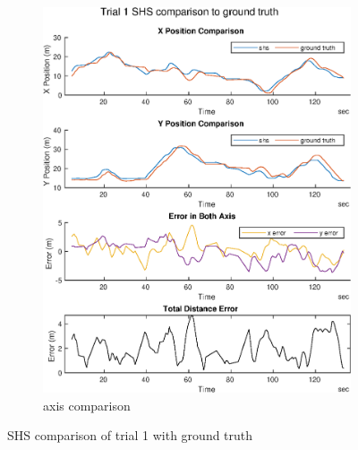 \begin{figure}[H]
\begin{subfigure}[t]{.45\textwidth}
		\includegraphics[width=\linewidth]{images/20201029_1040_trial1_shs_2}
		\caption{axis comparison}
		\label{fig:trial1_comparison}
	\end{subfigure}
	\caption{SHS comparison of trial 1 with ground truth}
	\label{fig:trial1_shs_gt_comparison}
\end{figure}
\newpage
